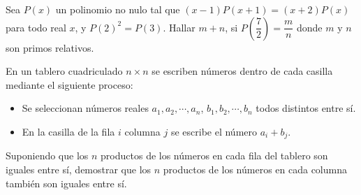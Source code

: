 \begin{section-problem}
    Sea $P(x)$ un polinomio no nulo tal que $(x - 1)P(x + 1) = (x + 2)P(x)$ para todo real $x$, y $P(2)^2 = P(3)$.
    Hallar $m + n$, si $P\left(\dfrac{7}{2}\right) = \dfrac{m}{n}$ donde $m$ y $n$ son primos relativos.
\end{section-problem}

\begin{section-problem}
    En un tablero cuadriculado $n \times n$ se escriben números dentro de cada casilla mediante el siguiente proceso:
    \begin{itemize}
        \item Se seleccionan números reales $a_1, a_2, \cdots, a_n$, $b_1, b_2, \cdots, b_n$ todos distintos entre sí.
        \item En la casilla de la fila $i$ columna $j$ se escribe el número $a_i + b_j$.
    \end{itemize}
    Suponiendo que los $n$ productos de los números en cada fila del tablero son iguales entre sí, demostrar que los $n$ productos de los números en cada columna también son iguales entre sí.
\end{section-problem}